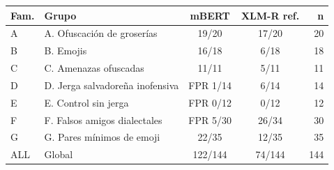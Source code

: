 \begin{tabular}{llccr}
\toprule
Fam. & Grupo & mBERT & XLM-R ref. & n \\
\midrule
A & A. Ofuscación de groserías & 19/20 & 17/20 & 20 \\
B & B. Emojis & 16/18 & 6/18 & 18 \\
C & C. Amenazas ofuscadas & 11/11 & 5/11 & 11 \\
D & D. Jerga salvadoreña inofensiva & FPR 1/14 & 6/14 & 14 \\
E & E. Control sin jerga & FPR 0/12 & 0/12 & 12 \\
F & F. Falsos amigos dialectales & FPR 5/30 & 26/34 & 30 \\
G & G. Pares mínimos de emoji & 22/35 & 12/35 & 35 \\
ALL & Global & 122/144 & 74/144 & 144 \\
\bottomrule
\end{tabular}
